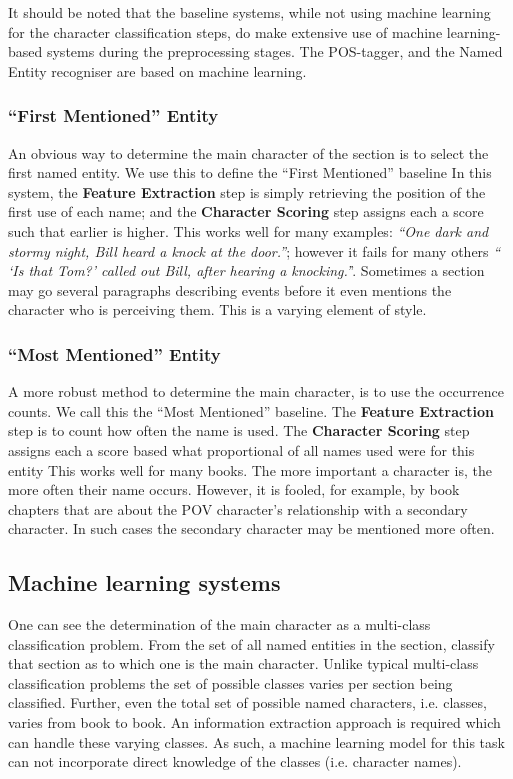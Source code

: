 \documentclass[11pt,a4paper]{article}
\begin{document}
It should be noted that the baseline systems, while not using machine learning for the  character classification steps, do make extensive use of machine learning-based systems during the preprocessing stages.
The POS-tagger, and the Named Entity recogniser are based on machine learning.

\subsubsection{``First Mentioned'' Entity}
An obvious way to determine the main character of the section is to select the first named entity.
We use this to define the ``First Mentioned'' baseline
In this system, the \textbf{Feature Extraction} step is simply retrieving the position of the first use of each name;
and the \textbf{Character Scoring} step assigns each a score such that earlier is higher.
This works well for many examples: \emph{``One dark and stormy night, Bill heard a knock at the door.''};
however it fails for many others \emph{`` `Is that Tom?' called out Bill, after hearing a knocking.'}'.
Sometimes a section  may go several paragraphs describing events before it even mentions the character who is perceiving them.
This is a varying element of style.

\subsubsection{``Most Mentioned'' Entity}
A more robust method to determine the main character, is to use the occurrence counts.
We call this the ``Most Mentioned'' baseline.
The \textbf{Feature Extraction} step is to count how often the name is used.
The \textbf{Character Scoring} step assigns each a score based what proportional of all names used were for this entity
This works well for many books.
The more important a character is, the more often their name occurs.
However, it is fooled, for example, by book chapters that are about the POV character's relationship with a secondary character.
In such cases the secondary character may be mentioned more often.

\subsection{Machine learning systems}
One can see the determination of the main character as a multi-class classification problem.
From the set of all named entities in the section, classify that section as to which one is the main character.
Unlike typical multi-class classification problems
the set of possible classes varies per section being classified.
Further, even the total set of possible named characters, i.e.  classes, varies from book to book.
An information extraction approach is required which can handle these varying classes.
As such, a machine learning model for this task can not incorporate direct knowledge of the classes (i.e. character names).
\end{document}
